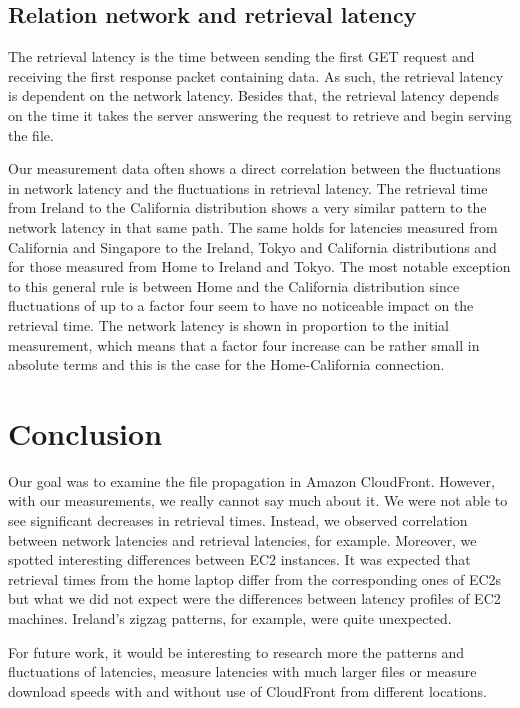 \documentclass[conference]{IEEEtran}
\begin{document}
\subsection{Relation network and retrieval latency}
The retrieval latency is the time between sending the first GET request and receiving the first response packet containing data. As such, the retrieval latency is dependent on the network latency. Besides that, the retrieval latency depends on the time it takes the server answering the request to retrieve and begin serving the file.

Our measurement data often shows a direct correlation between the fluctuations in network latency and the fluctuations in retrieval latency. The retrieval time from Ireland to the California distribution shows a very similar pattern to the network latency in that same path. The same holds for latencies measured from California and Singapore to the Ireland, Tokyo and California distributions and for those measured from Home to Ireland and Tokyo. The most notable exception to this general rule is between Home and the California distribution since fluctuations of up to a factor four seem to have no noticeable impact on the retrieval time. The network latency is shown in proportion to the initial measurement, which means that a factor four increase can be rather small in absolute terms and this is the case for the Home-California connection.


\section{Conclusion}
Our goal was to examine the file propagation in Amazon CloudFront. However, with our measurements, we really cannot say much about it. We were not able to see significant decreases in retrieval times. Instead, we observed correlation between network latencies and retrieval latencies, for example. Moreover, we spotted interesting differences between EC2 instances. It was expected that retrieval times from the home laptop differ from the corresponding ones of EC2s but what we did not expect were the differences between latency profiles of EC2 machines. Ireland's zigzag patterns, for example, were quite unexpected.

For future work, it would be interesting to research more the patterns and fluctuations of latencies, measure latencies with much larger files or measure download speeds with and without use of CloudFront from different locations.






\end{document}
